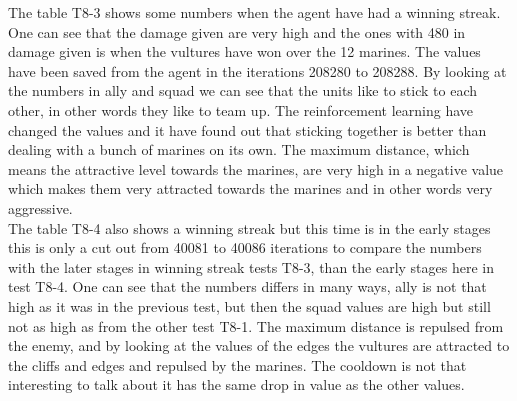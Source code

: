
The table T8-3 shows some numbers when the agent have had a winning streak. One can see that the damage given are very high and the ones with 480 in damage given is when the vultures have won over the 12 marines. The values have been saved from the agent in the iterations 208280 to 208288. By looking at the numbers in ally and squad we can see that the units like to stick to each other, in other words they like to team up. The reinforcement learning have changed the values and it have found out that sticking together is better than dealing with a bunch of marines on its own. The maximum distance, which means the attractive level towards the marines, are very high in a negative value which makes them very attracted towards the marines and in other words very aggressive. \\



The table T8-4 also shows a winning streak but this time is in the early stages this is only a cut out from 40081 to 40086 iterations to compare the numbers with the later stages in winning streak tests T8-3, than the early stages here in test T8-4. One can see that the numbers differs in many ways, ally is not that high as it was in the previous test, but then the squad values are high but still not as high as from the other test T8-1. The maximum distance is repulsed from the enemy, and by looking at the values of the edges the vultures are attracted to the cliffs and edges and repulsed by the marines. The cooldown is not that interesting to talk about it has the same drop in value as the other values.
